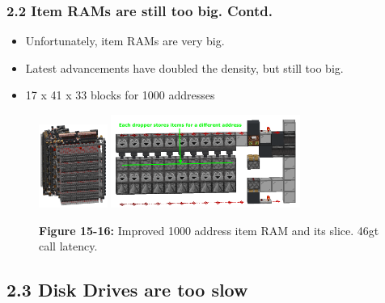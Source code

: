 \documentclass[aspectratio=169]{beamer}
\begin{document}
\begin{frame}
	\frametitle{2.2 Item RAMs are still too big. Contd.}

    \begin{itemize}
		\item Unfortunately, item RAMs are very big.
		\item Latest advancements have doubled the density, but still too big.
		\item 17 x 41 x 33 blocks for 1000 addresses
	\end{itemize}
    \begin{figure}
        \includegraphics[width=0.2\textwidth]{bigram.png}
        \includegraphics[width=0.55\textwidth]{bigramslice.png}
        \caption{\textbf{Figure 15-16:} Improved 1000 address item RAM and its slice. 46gt call latency.}
	
    \end{figure}
\end{frame}

\subsection{2.3 Disk Drives are too slow}
\end{document}
